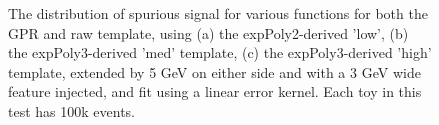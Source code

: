 \begin{figure} 
\begin{center}

\caption{The distribution of spurious signal for various functions for both the GPR and raw template, using (a) the expPoly2-derived 'low', (b) the expPoly3-derived 'med' template, (c) the expPoly3-derived 'high' template, extended by 5 GeV on either side and with a 3 GeV wide feature injected, and fit using a linear error kernel. Each toy in this test has 100k events.}
\label{fig:linearkernel_lowpt_100k_Sig_1s}
\end{center}
\end{figure}

